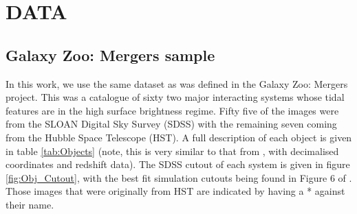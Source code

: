 \vspace{-5mm}
\section{DATA}\label{Data}
\subsection{Galaxy Zoo: Mergers sample}
\noindent In this work, we use the same dataset as was defined in the Galaxy Zoo: Mergers project. This was a catalogue of sixty two major interacting systems whose tidal features are in the high surface brightness regime. Fifty five of the images were from the SLOAN Digital Sky Survey (SDSS) with the remaining seven coming from the Hubble Space Telescope (HST). A full description of each object is given in table \ref{tab:Objects} (note, this is very similar to that from \citet{2016MNRAS.459..720H}, with decimalised coordinates and redshift data). The SDSS cutout of each system is given in figure \ref{fig:Obj_Cutout}, with the best fit simulation cutouts being found in Figure 6 of \citet{2016MNRAS.459..720H}. Those images that were originally from HST are indicated by having a * against their name.

